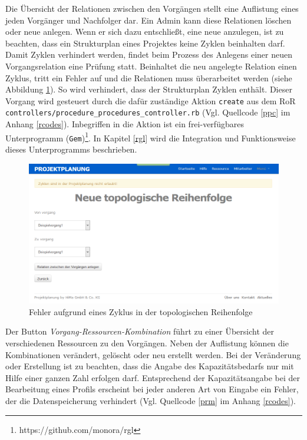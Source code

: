 \documentclass[a4paper,12pt,parskip,bibtotoc,liststotoc]{article}
\begin{document}
Die Übersicht der Relationen zwischen den Vorgängen stellt eine Auflistung eines jeden Vorgänger und Nachfolger dar. Ein Admin kann diese Relationen löschen oder neue anlegen. Wenn er sich dazu entschließt, eine neue anzulegen, ist zu beachten, dass ein Strukturplan eines Projektes keine Zyklen beinhalten darf. Damit Zyklen verhindert werden, findet beim Prozess des Anlegens einer neuen Vorgangsrelation eine Prüfung statt. Beinhaltet die neu angelegte Relation einen Zyklus, tritt ein Fehler auf und die Relationen muss überarbeitet werden (siehe Abbildung \ref{VorErr}). So wird verhindert, dass der Strukturplan Zyklen enthält. Dieser Vorgang wird gesteuert durch die dafür zuständige Aktion \texttt{create} aus dem RoR \texttt{controllers/procedure\_procedures\_controller.rb} (Vgl. Quellcode \ref{ppc} im Anhang \ref{rcodes}). Inbegriffen in die Aktion ist ein frei-verfügbares Unterprogramm (\texttt{Gem})\footnote{https://github.com/monora/rgl}. In Kapitel \ref{rgl} wird die Integration und Funktionsweise dieses Unterprogramms beschrieben. \\

\begin{figure}[h!]
  \begin{center}
    \includegraphics[width=120mm]{Bilder/Vorgangsrel_Fehler.png}
    \caption{Fehler aufgrund eines Zyklus in der topologischen Reihenfolge}  \label{VorErr}
  \end{center}
\end{figure}
 
Der Button \textit{Vorgang-Ressourcen-Kombination} führt zu einer Übersicht der verschiedenen Ressourcen zu den Vorgängen. Neben der Auflistung können die Kombinationen verändert, gelöscht oder neu erstellt werden. Bei der Veränderung oder Erstellung ist zu beachten, dass die Angabe des Kapazitätsbedarfs nur mit Hilfe einer ganzen Zahl erfolgen darf. Entsprechend der Kapazitätsangabe bei der Bearbeitung eines Profils erscheint bei jeder anderen Art von Eingabe ein Fehler, der die Datenspeicherung verhindert (Vgl. Quellcode \ref{prm} im Anhang \ref{rcodes}).\\
\end{document}
